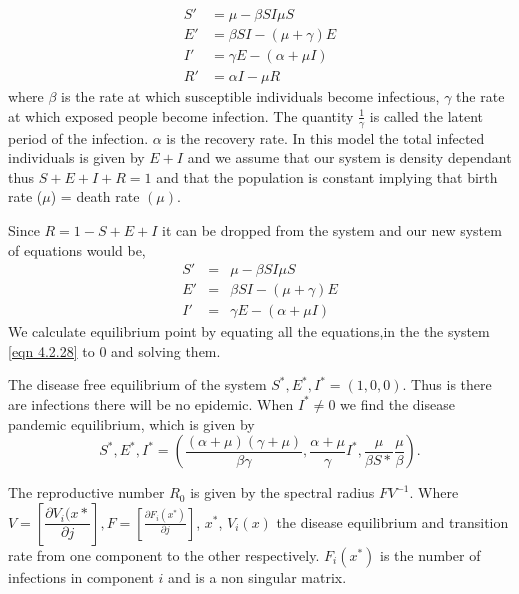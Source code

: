 \begin{align}
S'& = \mu -\beta S I  \mu S \\
E' &= \beta S I - (\mu + \gamma) E  \\
I' &= \gamma E - (\alpha + \mu I) \\
R' &= \alpha I  - \mu R 
\end{align}
where $\beta$ is the rate at which susceptible individuals become infectious, $\gamma$ the rate at which exposed people become infection. The quantity $\frac{1}{\gamma}$ is called the latent period of the  infection. $\alpha$ is the recovery rate.
In this model the total infected individuals is given by $E +I$ and  we assume that our system is density dependant thus $S + E + I + R = 1$ and  that the population is constant implying that birth rate ($\mu$)  = death rate $(\mu)$.
 
Since $R = 1- S + E + I$
it can be dropped from the system and our new system of equations would be, 
\begin{equation} \label{eqn 4.2.28}
\begin{array}{ccc}
S'&=& \mu -\beta S I  \mu S \\
E' &=& \beta S I - (\mu + \gamma) E  \\
I' &=& \gamma E - (\alpha + \mu I)
\end{array}
\end{equation}
We calculate equilibrium point by equating all the equations,in the the system  \ref{eqn 4.2.28} to 0 and solving them. 

The disease free equilibrium of the system $S^*, E^*, I^* = (1,0,0)$.
Thus is there are infections there will be no epidemic. When $I^* \neq 0$ we find the disease pandemic equilibrium, which is given by
\begin{equation*}
S^*, E^*, I^*  = \left(\frac{(\alpha + \mu)(\gamma + \mu)}{\beta \gamma} , \frac{\alpha + \mu }{ \gamma} I^*, \frac{\mu}{\beta S*} \frac{\mu}{\beta} \right).
\end{equation*}

The reproductive number $R_0$ is given by the spectral radius $FV^{-1}$.  Where  
$ V = \left[\dfrac{\partial V_i(x*}{\partial j} \right],  F = \left[ \frac{\partial F_i (x^*)}{\partial j}\right]$,  $x^*$, $V_i (x)$  the disease equilibrium and transition rate from one component to the other respectively. $F_i(x^*)$ is the  number of infections in component $i$ and is a non singular matrix.

